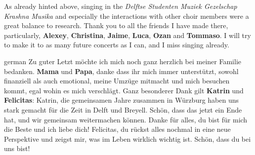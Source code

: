 As already hinted above, singing in the \textit{Delftse Studenten Muziek Gezelschap Krashna Musika} and especially the interactions with other choir members were a great balance to research.
%
Thank you to all the friends I have made there, particularly, \textbf{Alexey}, \textbf{Christina}, \textbf{Jaime}, \textbf{Luca}, \textbf{Ozan} and \textbf{Tommaso}.
%
I will try to make it to as many future concerts as I can, and I miss singing already.

\begin{otherlanguage*}{german}
Zu guter Letzt möchte ich mich noch ganz herzlich bei meiner Familie bedanken.
%
\textbf{Mama} und \textbf{Papa}, danke dass ihr mich immer unterstützt, sowohl finanziell als auch emotional, meine Umzüge mitmacht und mich besuchen kommt, egal wohin es mich verschlägt.
%
Ganz besonderer Dank gilt \textbf{Katrin} und \textbf{Felicitas}:
%
Katrin, die gemeinsamen Jahre zusammen in Würzburg haben uns stark gemacht für die Zeit in Delft und Breyell.
%
Schön, dass das jetzt ein Ende hat, und wir gemeinsam weitermachen können.
%
Danke für alles, du bist für mich die Beste und ich liebe dich!
%
Felicitas, du rückst alles nochmal in eine neue Perspektive und zeigst mir, was im Leben wirklich wichtig ist.
%
Schön, dass du bei uns bist!
\end{otherlanguage*}